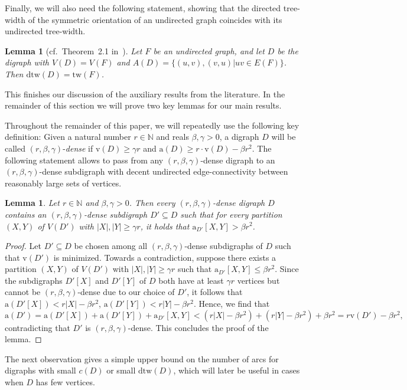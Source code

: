 \documentclass[a4paper,10pt]{article}
\newtheorem{lemma}[theorem]{Lemma}
\begin{document}
\noindent Finally, we will also need the following statement, showing that the directed tree-width of the symmetric orientation of an undirected graph coincides with its undirected tree-width.
\begin{lemma}[cf.~Theorem~2.1 in~\cite{MR1828440}]\label{lem:symmetric}
Let $F$ be an undirected graph, and let $D$ be the digraph with $V(D)=V(F)$ and $A(D)=\{(u,v),(v,u)|uv\in E(F)\}$. Then $\mathrm{dtw}(D)=\mathrm{tw}(F)$.
\end{lemma}

This finishes our discussion of the auxiliary results from the literature. In the remainder of this section we will prove two key lemmas for our main results.

Throughout the remainder of this paper, we %
will repeatedly use the following key definition: Given a natural number $r\in\mathbb{N}$ and reals $\beta, \gamma>0$, a digraph $D$ will be called $(r,\beta,\gamma)$-\emph{dense} if $\mathrm{v}(D)\ge \gamma r$ and $\mathrm{a}(D)\ge r\cdot \mathrm{v}(D)-\beta r^2$. The following statement allows to pass from any $(r,\beta,\gamma)$-dense digraph to an $(r,\beta,\gamma)$-dense subdigraph with decent undirected edge-connectivity between reasonably large sets of vertices.
\begin{lemma}\label{lem:edgeconnectivity}
Let $r\in \mathbb{N}$ and $\beta,\gamma>0$. Then every $(r,\beta,\gamma)$-dense digraph $D$ contains an $(r,\beta,\gamma)$-dense subdigraph $D'\subseteq D$ such that for every partition $(X,Y)$ of $V(D')$ with $|X|, |Y|\ge \gamma r$, it holds that $\mathrm{a}_{D'}[X,Y]> \beta r^2$. 
\end{lemma}
\begin{proof}
Let $D'\subseteq D$ be chosen among all $(r,\beta,\gamma)$-dense subdigraphs of $D$ such that $\mathrm{v}(D')$ is minimized. Towards a contradiction, suppose there exists a partition $(X,Y)$ of $V(D')$ with $|X|,|Y|\ge \gamma r$ such that $\mathrm{a}_{D'}[X,Y]\le\beta r^2$. Since the subdigraphs $D'[X]$ and $D'[Y]$ of $D$ both have at least $\gamma r$ vertices but cannot be $(r,\beta,\gamma)$-dense due to our choice of $D'$, it follows that $\mathrm{a}(D'[X])<r|X|-\beta r^2$, $\mathrm{a}(D'[Y])<r|Y|-\beta r^2$. Hence, we find that
$$\mathrm{a}(D')=\mathrm{a}(D'[X])+\mathrm{a}(D'[Y])+\mathrm{a}_{D'}[X,Y]<(r|X|-\beta r^2)+(r|Y|-\beta r^2)+\beta r^2=r\mathrm{v}(D')-\beta r^2,$$ contradicting that $D'$ is $(r,\beta,\gamma)$-dense. This concludes the proof of the lemma.
\end{proof}
The next observation gives a simple upper bound on the number of arcs for digraphs with small $c(D)$ or small $\mathrm{dtw}(D)$, which will later be useful in cases when $D$ has few vertices.
\end{document}
